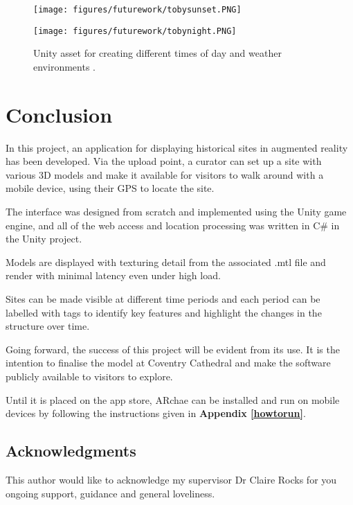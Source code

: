 \documentclass[12pt, a4paper]{article}
\begin{document}
\begin{figure}[H]
\centering
\begin{minipage}{.5\textwidth}
  \centering
  \texttt{[image: figures/futurework/tobysunset.PNG]}
\end{minipage}%
\begin{minipage}{.5\textwidth}
  \centering
  \texttt{[image: figures/futurework/tobynight.PNG]}
\end{minipage}
\caption{Unity asset for creating different times of day 
and weather environments \cite{futurework:weather}.}
\label{fig:weather}
\end{figure}

\newpage
\section{Conclusion}
In this project, an application for displaying historical sites in augmented reality has been developed. Via the upload point, a curator can set up a site with various 3D models and make it available for visitors to walk around with a mobile device, using their GPS to locate the site. 

The interface was designed from scratch and implemented using the Unity game engine, and all of the web access and location processing was written in C\# in the Unity project. 

Models are displayed with texturing detail from the associated .mtl file and render with minimal latency even under high load. 

Sites can be made visible at different time periods and each period can be labelled with tags to identify key features and highlight the changes in the structure over time.

Going forward, the success of this project will be evident from its use. It is the intention to finalise the model at Coventry Cathedral and make the software publicly available to visitors to explore.

Until it is placed on the app store, ARchae can be installed and run on mobile devices by following the instructions given in \textbf{Appendix \ref{howtorun}}.

\newpage
\subsection*{\centering Acknowledgments}
This author would like to acknowledge my supervisor Dr Claire Rocks for you ongoing support, guidance and general loveliness.
\end{document}
